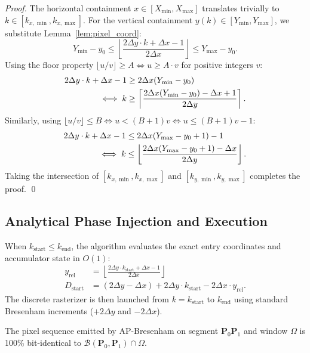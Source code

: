 \documentclass[runningheads]{llncs}
\begin{document}
\begin{proof}
The horizontal containment $x \in [X_{\min}, X_{\max}]$ translates trivially to $k \in [k_{x,\min}, k_{x,\max}]$.
For the vertical containment $y(k) \in [Y_{\min}, Y_{\max}]$, we substitute Lemma~\ref{lem:pixel_coord}:
\begin{equation}
    Y_{\min} - y_0 \le \left\lfloor \frac{2\Delta y \cdot k + \Delta x - 1}{2\Delta x} \right\rfloor \le Y_{\max} - y_0.
\end{equation}
Using the floor property $\lfloor u / v \rfloor \ge A \iff u \ge A \cdot v$ for positive integers $v$:
\begin{align}
    2\Delta y \cdot k + \Delta x - 1 &\ge 2\Delta x (Y_{\min} - y_0) \notag \\
    \iff k &\ge \left\lceil \frac{2\Delta x (Y_{\min} - y_0) - \Delta x + 1}{2\Delta y} \right\rceil.
\end{align}
Similarly, using $\lfloor u / v \rfloor \le B \iff u < (B + 1) v \iff u \le (B + 1) v - 1$:
\begin{align}
    2\Delta y \cdot k + \Delta x - 1 &\le 2\Delta x (Y_{\max} - y_0 + 1) - 1 \notag \\
    \iff k &\le \left\lfloor \frac{2\Delta x (Y_{\max} - y_0 + 1) - \Delta x}{2\Delta y} \right\rfloor.
\end{align}
Taking the intersection of $[k_{x,\min}, k_{x,\max}]$ and $[k_{y,\min}, k_{y,\max}]$ completes the proof. \qed
\end{proof}

\subsection{Analytical Phase Injection and Execution}
When $k_{\mathrm{start}} \le k_{\mathrm{end}}$, the algorithm evaluates the exact entry coordinates and accumulator state in $O(1)$:
\begin{align}
    y_{\mathrm{rel}} &= \left\lfloor \frac{2\Delta y \cdot k_{\mathrm{start}} + \Delta x - 1}{2\Delta x} \right\rfloor \\
    D_{\mathrm{start}} &= (2\Delta y - \Delta x) + 2\Delta y \cdot k_{\mathrm{start}} - 2\Delta x \cdot y_{\mathrm{rel}}.
\end{align}
The discrete rasterizer is then launched from $k = k_{\mathrm{start}}$ to $k_{\mathrm{end}}$ using standard Bresenham increments ($+2\Delta y$ and $-2\Delta x$).

\begin{theorem}
\label{thm:bit_identity}
The pixel sequence emitted by AP-Bresenham on segment $\mathbf{P}_0\mathbf{P}_1$ and window $\Omega$ is 100\% bit-identical to $\mathcal{B}(\mathbf{P}_0, \mathbf{P}_1) \cap \Omega$.
\end{theorem}
\end{document}
